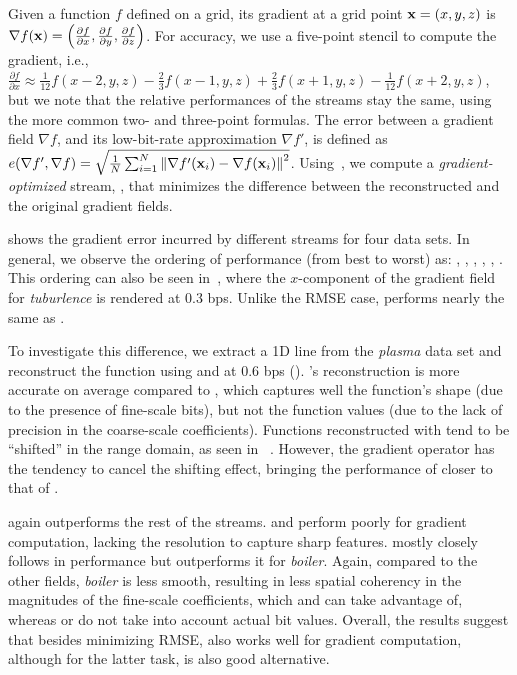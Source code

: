 Given a function $f$ defined on a grid, its gradient at a grid point \mbox{$\x = (x,y,z)$} is
$\nabla f(\x) = \left(\frac{\partial f}{\partial x}, \frac{\partial f}{\partial y}, \frac{\partial
f}{\partial z}\right)$. For accuracy, we use a five-point stencil to compute the gradient, i.e.,
$\frac{\partial f}{\partial x} \approx \frac{1}{12}f(x-2,y,z) - \frac{2}{3}f(x-1,y,z) +
\frac{2}{3}f(x+1,y,z) - \frac{1}{12}f(x+2,y,z)$, but we note that the relative performances of the
streams stay the same, using the more common two- and three-point formulas. The error between a
gradient field $\nabla f$, and its low-bit-rate approximation $\nabla f'$, is defined as
$\err(\nabla f', \nabla f) = \sqrt{\frac{1}{N} \sum_{i=1}^{N}{\norm{\nabla f'(\x_i)-\nabla
f(\x_i)}^2}}$. Using~, we compute a \emph{gradient-optimized} stream, \sgop, that
minimizes the difference between the reconstructed and the original gradient fields.

 shows the gradient error incurred by different streams for four
data sets. In general, we observe the ordering of performance (from best to worst) as: \sgop, \sgsg,
\sbit, \swav, \smag, \slvl. This ordering can also be seen in~,
where the $x$-component of the gradient field for \emph{tuburlence} is rendered at 0.3 bps. Unlike
the RMSE case, \sbit performs nearly the same as \swav.

To investigate this difference, we extract a 1D line from the \emph{plasma} data set and reconstruct
the function using \sbit and \swav at 0.6 bps ().
\swav's reconstruction is more accurate on average compared to \sbit, which captures well the
function's shape (due to the presence of fine-scale bits), but not the function values (due to the
lack of precision in the coarse-scale coefficients). Functions reconstructed with \sbit tend to be
``shifted'' in the range domain, as seen in ~. However,
the gradient operator has the tendency to cancel the shifting effect, bringing the performance of
\sbit closer to that of \swav.

\sgop again outperforms the rest of the streams. \slvl and \smag perform poorly for gradient
computation, lacking the resolution to capture sharp features. \sgsg mostly closely follows \sbit in
performance but outperforms it for \emph{boiler}. Again, compared to the other fields, \emph{boiler}
is less smooth, resulting in less spatial coherency in the magnitudes of the fine-scale
coefficients, which \sgop and \sgsg can take advantage of, whereas \swav or \sbit do not take into
account actual bit values. Overall, the results suggest that besides minimizing RMSE, \swav also
works well for gradient computation, although for the latter task, \sbit is also good alternative.

